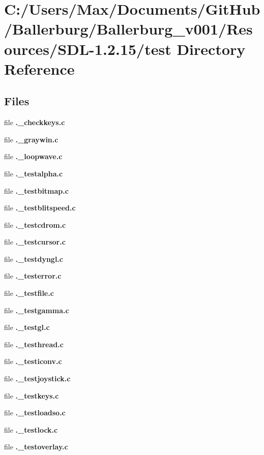 \section{C\+:/\+Users/\+Max/\+Documents/\+Git\+Hub/\+Ballerburg/\+Ballerburg\+\_\+v001/\+Resources/\+S\+D\+L-\/1.2.15/test Directory Reference}
\label{dir_67bdcf7955fdcabfadb81d7ab8dce7c3}
\subsection*{Files}
\begin{DoxyCompactItemize}
\item 
file {\bfseries .\+\_\+checkkeys.\+c}
\item 
file {\bfseries .\+\_\+graywin.\+c}
\item 
file {\bfseries .\+\_\+loopwave.\+c}
\item 
file {\bfseries .\+\_\+testalpha.\+c}
\item 
file {\bfseries .\+\_\+testbitmap.\+c}
\item 
file {\bfseries .\+\_\+testblitspeed.\+c}
\item 
file {\bfseries .\+\_\+testcdrom.\+c}
\item 
file {\bfseries .\+\_\+testcursor.\+c}
\item 
file {\bfseries .\+\_\+testdyngl.\+c}
\item 
file {\bfseries .\+\_\+testerror.\+c}
\item 
file {\bfseries .\+\_\+testfile.\+c}
\item 
file {\bfseries .\+\_\+testgamma.\+c}
\item 
file {\bfseries .\+\_\+testgl.\+c}
\item 
file {\bfseries .\+\_\+testhread.\+c}
\item 
file {\bfseries .\+\_\+testiconv.\+c}
\item 
file {\bfseries .\+\_\+testjoystick.\+c}
\item 
file {\bfseries .\+\_\+testkeys.\+c}
\item 
file {\bfseries .\+\_\+testloadso.\+c}
\item 
file {\bfseries .\+\_\+testlock.\+c}
\item 
file {\bfseries .\+\_\+testoverlay.\+c}
\item 

\end{DoxyCompactItemize}
